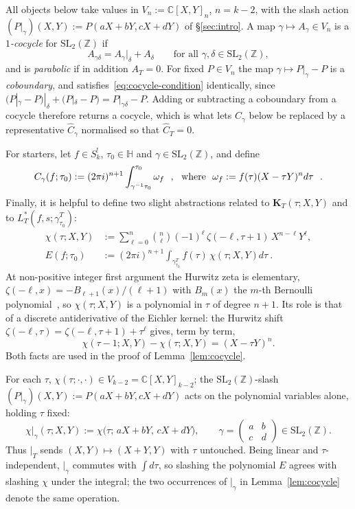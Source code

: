 \documentclass[11pt]{article}
\newcommand{\HH}{\mathbb{H}}
\newcommand{\ZZ}{\mathbb{Z}}
\newcommand{\CC}{\mathbb{C}}
\newcommand{\SLZ}{\mathrm{SL}_2(\ZZ)}
\begin{document}
All objects below take values in $V_n:=\CC[X,Y]_n$, $n=k-2$, with the slash action
$(P|_\gamma)(X,Y):=P(aX+bY,cX+dY)$ of \S\ref{sec:intro}. A map $\gamma\mapsto A_\gamma\in V_n$ is a
\emph{$1$-cocycle} for $\SLZ$ if
\begin{equation}\label{eq:cocycle-condition}
A_{\gamma\delta}=A_\gamma|_\delta+A_\delta\qquad\text{for all }\gamma,\delta\in\SLZ ,
\end{equation}
and is \emph{parabolic} if in addition $A_T=0$. For fixed $P\in V_n$ the map
$\gamma\mapsto P|_\gamma-P$ is a \emph{coboundary}, and satisfies~\eqref{eq:cocycle-condition}
identically, since $(P|_\gamma-P)|_\delta+(P|_\delta-P)=P|_{\gamma\delta}-P$. Adding or subtracting
a coboundary from a cocycle therefore returns a cocycle, which is what lets $C_\gamma$ below be
replaced by a representative $\hat C_\gamma$ normalised so that $\hat C_T=0$.

For starters, let $f \in S_k^!$, $\tau_0 \in \HH$ and $\gamma \in \SLZ$, and define
\begin{equation}
C_\gamma(f; \tau_0):= (2\pi i)^{n+1}\int_{\gamma^{-1}\tau_0}^{\tau_0} \omega_f ~~,~~{\rm where}~~\omega_f := f(\tau) (X - \tau Y)^n d\tau~~.\label{cocycleR1}
\end{equation} 
Finally, it is helpful to define two slight abstractions related to $\mathbf K_T(\tau;X,Y)$ and to 
$L_T^*(f, s; \gamma^T_{\tau_0})$:
\begin{align}
\chi(\tau;X,Y)&:=\sum_{\ell=0}^{n}\binom{n}{\ell}(-1)^\ell\,\zeta(-\ell,\tau+1)\,X^{n-\ell}Y^\ell , \label{cocycleR2}\\
E(f; \tau_0)&:=(2\pi i)^{n+1}\!\!\int_{\gamma^T_{\tau_0}}\!\! f(\tau)\,\chi(\tau; X, Y) d\tau ~.\label{cocycleR3}
\end{align}
At non-positive integer first argument the Hurwitz zeta is elementary,
$\zeta(-\ell,x)=-B_{\ell+1}(x)/(\ell+1)$ with $B_m(x)$ the $m$-th Bernoulli
polynomial~\cite[\S25.11]{DLMF}, so $\chi(\tau;X,Y)$ is a polynomial in $\tau$ of degree $n+1$.
Its role is that of a discrete antiderivative of the Eichler kernel: the Hurwitz shift
$\zeta(-\ell,\tau)=\zeta(-\ell,\tau+1)+\tau^{\ell}$ gives, term by term,
\begin{equation}\label{eq:chi-shift}
\chi(\tau-1;X,Y)-\chi(\tau;X,Y)=(X-\tau Y)^{n} .
\end{equation}
Both facts are used in the proof of Lemma~\ref{lem:cocycle}.

For each $\tau$, $\chi(\tau;\cdot,\cdot)\in V_{k-2}=\CC[X,Y]_{k-2}$; the $\SLZ$-slash
$(P|_\gamma)(X,Y):=P(aX+bY,cX+dY)$ acts on the polynomial variables alone, holding $\tau$ fixed:
\begin{equation}
\chi|_\gamma(\tau;X,Y):=\chi\big(\tau;\,aX+bY,\,cX+dY\big),\qquad
\gamma=\left(\begin{smallmatrix}a&b\\c&d\end{smallmatrix}\right)\in\SLZ .
\end{equation}
Thus $|_T$ sends $(X,Y)\mapsto(X+Y,Y)$ with $\tau$ untouched. Being linear and $\tau$-independent,
$|_\gamma$ commutes with $\int\!d\tau$, so slashing the polynomial $E$ agrees with slashing $\chi$
under the integral; the two occurrences of $|_\gamma$ in Lemma~\ref{lem:cocycle} denote the same
operation.
\end{document}
